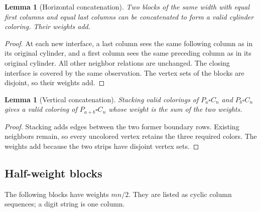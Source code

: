 \documentclass[11pt]{article}
\newtheorem{lemma}[theorem]{Lemma}
\theoremstyle{definition}
\theoremstyle{remark}
\begin{document}
\begin{lemma}[Horizontal concatenation]\label{lem:horizontal}
Two blocks of the same width with equal first columns and equal last columns can be concatenated to form a valid cylinder coloring. Their weights add.
\end{lemma}

\begin{proof}
At each new interface, a last column sees the same following column as in its original cylinder, and a first column sees the same preceding column as in its original cylinder. All other neighbor relations are unchanged. The closing interface is covered by the same observation. The vertex sets of the blocks are disjoint, so their weights add.
\end{proof}

\begin{lemma}[Vertical concatenation]\label{lem:vertical}
Stacking valid colorings of $P_a\square C_n$ and $P_b\square C_n$ gives a valid coloring of $P_{a+b}\square C_n$ whose weight is the sum of the two weights.
\end{lemma}

\begin{proof}
Stacking adds edges between the two former boundary rows. Existing neighbors remain, so every uncolored vertex retains the three required colors. The weights add because the two strips have disjoint vertex sets.
\end{proof}

\subsection{Half-weight blocks}

The following blocks have weights $mn/2$. They are listed as cyclic column sequences; a digit string is one column.
\end{document}
